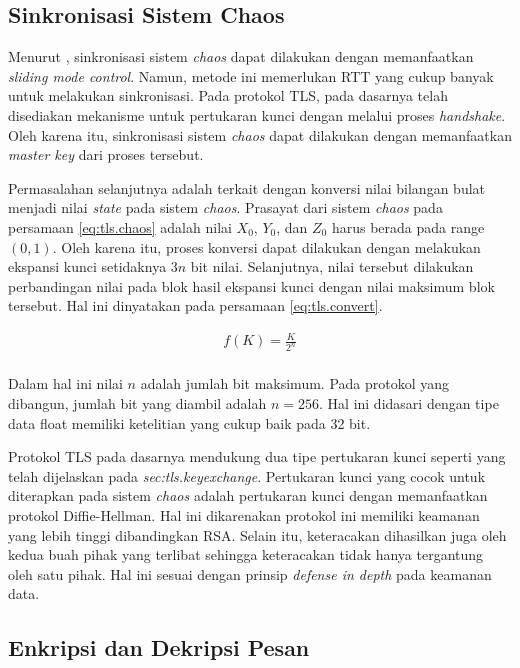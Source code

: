 \subsection{Sinkronisasi Sistem Chaos}

Menurut \textcite{lin2021}, sinkronisasi sistem \emph{chaos} dapat dilakukan dengan memanfaatkan \emph{sliding mode control}. Namun, metode ini memerlukan RTT yang cukup banyak untuk melakukan sinkronisasi. Pada protokol TLS, pada dasarnya telah disediakan mekanisme untuk pertukaran kunci dengan melalui proses \emph{handshake}. Oleh karena itu, sinkronisasi sistem \emph{chaos} dapat dilakukan dengan memanfaatkan \emph{master key} dari proses tersebut.

Permasalahan selanjutnya adalah terkait dengan konversi nilai bilangan bulat menjadi nilai \emph{state} pada sistem \emph{chaos}. Prasayat dari sistem \emph{chaos} pada persamaan \ref{eq:tls.chaos} adalah nilai $X_0$, $Y_0$, dan $Z_0$ harus berada pada range $(0,1)$. Oleh karena itu, proses konversi dapat dilakukan dengan melakukan ekspansi kunci setidaknya $3n$ bit nilai. Selanjutnya, nilai tersebut dilakukan perbandingan nilai pada blok hasil ekspansi kunci dengan nilai maksimum blok tersebut. Hal ini dinyatakan pada persamaan \ref{eq:tls.convert}.

\begin{equation}
  \begin{aligned}
    f(K) = \frac{K}{2^{n}} \\
  \end{aligned}
  \label{eq:tls.convert}
\end{equation}

Dalam hal ini nilai $n$ adalah jumlah bit maksimum. Pada protokol yang dibangun, jumlah bit yang diambil adalah $n = 256$. Hal ini didasari dengan tipe data float memiliki ketelitian yang cukup baik pada 32 bit.

Protokol TLS pada dasarnya mendukung dua tipe pertukaran kunci seperti yang telah dijelaskan pada \emph{sec:tls.keyexchange}. Pertukaran kunci yang cocok untuk diterapkan pada sistem \emph{chaos} adalah pertukaran kunci dengan memanfaatkan protokol Diffie-Hellman. Hal ini dikarenakan protokol ini memiliki keamanan yang lebih tinggi dibandingkan RSA. Selain itu, keteracakan dihasilkan juga oleh kedua buah pihak yang terlibat sehingga keteracakan tidak hanya tergantung oleh satu pihak. Hal ini sesuai dengan prinsip \emph{defense in depth} pada keamanan data.


\subsection{Enkripsi dan Dekripsi Pesan}
\label{sec:solusi.enc-dec}

